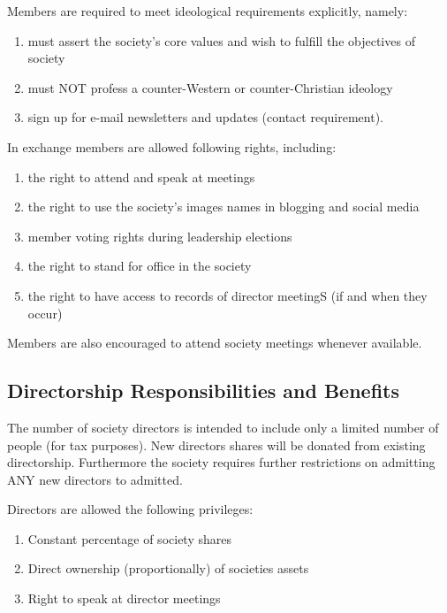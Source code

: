\documentclass[]{article}
\begin{document}
\vspace{2mm}
\noindent
Members are required to meet ideological requirements explicitly, namely:


\begin{enumerate}
	\item must assert the society's core values and wish to fulfill the objectives of society 
	\item must NOT profess a counter-Western or counter-Christian ideology
	\item sign up for e-mail newsletters and updates (contact requirement).
\end{enumerate}

\vspace{1mm}
\noindent
In exchange members are allowed following rights, including:


\begin{enumerate}
	\item the right to attend and speak at meetings
	\item the right to use the society's images names in blogging and social media 
	\item member voting rights during leadership elections
	\item the right to stand for office in the society 
	\item the right to have access to records of director meetingS (if and when they occur)
\end{enumerate}

\vspace{1mm}
\noindent 
Members are also encouraged to attend society meetings whenever available. 

\subsection{Directorship Responsibilities and Benefits}
\label{subsec:directors}

The number of society directors is intended to include only a limited number of people (for tax purposes). New directors shares will be donated from existing directorship. Furthermore the society requires further restrictions on admitting ANY new directors to admitted. 

\noindent
\vspace{2mm}
Directors are allowed the following privileges:

\begin{enumerate}
\item Constant percentage of society shares
\item Direct ownership (proportionally) of societies assets
\item Right to speak at director meetings
\end{enumerate}
\end{document}
